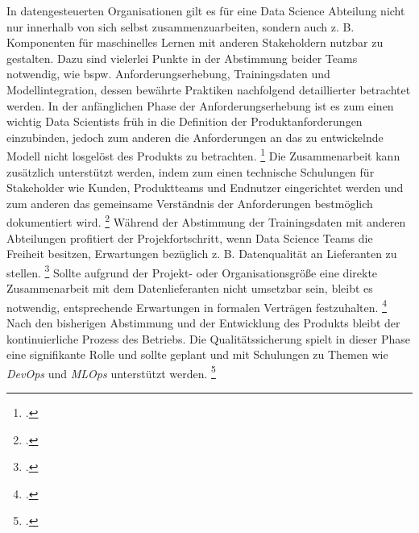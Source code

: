 In datengesteuerten Organisationen gilt es für eine Data Science Abteilung nicht nur innerhalb von sich selbst zusammenzuarbeiten, sondern auch z. B. Komponenten für maschinelles Lernen mit anderen Stakeholdern nutzbar zu gestalten.
Dazu sind vielerlei Punkte in der Abstimmung beider Teams notwendig, wie bspw. Anforderungserhebung, Trainingsdaten und Modellintegration, dessen bewährte Praktiken nachfolgend detaillierter betrachtet werden.
In der anfänglichen Phase der Anforderungserhebung ist es zum einen wichtig Data Scientists früh in die Definition der Produktanforderungen einzubinden, jedoch zum anderen die Anforderungen an das zu entwickelnde Modell nicht losgelöst des Produkts zu betrachten. \footcite[Vgl.][S. 418]{Nahar.2022}
Die Zusammenarbeit kann zusätzlich unterstützt werden, indem zum einen technische Schulungen für Stakeholder wie Kunden, Produktteams und Endnutzer eingerichtet werden und zum anderen das gemeinsame Verständnis der Anforderungen bestmöglich dokumentiert wird. \footcite[Vgl.][S. 418]{Nahar.2022}
Während der Abstimmung der Trainingsdaten mit anderen Abteilungen profitiert der Projekfortschritt, wenn Data Science Teams die Freiheit besitzen, Erwartungen bezüglich z. B. Datenqualität an Lieferanten zu stellen. \footcite[Vgl.][S. 420]{Nahar.2022}
Sollte aufgrund der Projekt- oder Organisationsgröße eine direkte Zusammenarbeit mit dem Datenlieferanten nicht umsetzbar sein, bleibt es notwendig, entsprechende Erwartungen in formalen Verträgen festzuhalten. \footcite[Vgl.][S. 420]{Nahar.2022}
Nach den bisherigen Abstimmung und der Entwicklung des Produkts bleibt der kontinuierliche Prozess des Betriebs.
Die Qualitätssicherung spielt in dieser Phase eine signifikante Rolle und sollte geplant und mit Schulungen zu Themen wie \textit{DevOps} und \textit{MLOps} unterstützt werden. \footcite[Vgl.][S. 423]{Nahar.2022}